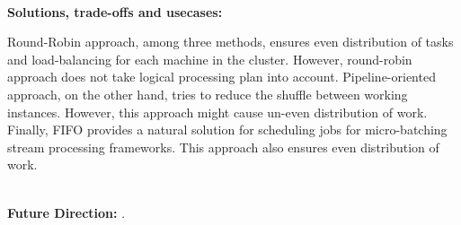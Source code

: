 \noindent \textbf{\\Solutions, trade-offs and usecases:}

Round-Robin approach, among three methods, ensures even distribution of tasks and load-balancing for each machine in the cluster. However, round-robin approach does not take logical processing plan into account. Pipeline-oriented approach, on the other hand, tries to reduce the shuffle between working instances. However, this approach might cause un-even distribution of work. Finally, FIFO provides a natural solution for scheduling jobs for micro-batching stream processing frameworks. This approach also ensures even distribution of work. 


\noindent \textbf{\\Future Direction:}  
.




